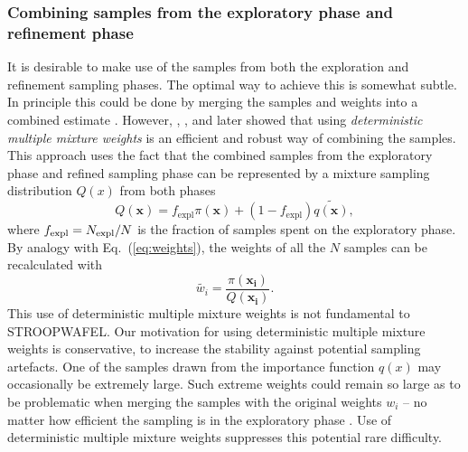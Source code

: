 \documentclass[a4paper,fleqn,usenatbib,useAMS,usedcolumn]{mnras}
\newcommand{\AISs}{\textsc{STROOPWAFEL}}
\begin{document}
\subsubsection{Combining samples from the exploratory phase and refinement phase}
\label{subsec:CombiningSamples}
%
It is desirable to make use of the samples from both the exploration and refinement sampling phases.  The optimal way to achieve this is somewhat subtle. 
In principle this could be done by merging the samples and weights into a combined estimate \citep[see Chapter 14][]{robert2013monte}. However, \citet{Veach:1995:OCS:218380.218498},  \citet{doi:10.1080/00401706.1995.10484303}, and later \citet{doi:10.1080/01621459.2000.10473909} showed that using 
\emph{deterministic multiple mixture weights} is an efficient and robust way of combining the samples. This approach uses the fact that the combined samples from the exploratory phase and refined sampling phase can be represented by a mixture sampling distribution $Q(x)$ from both phases
%
\begin{equation}
	Q(\boldsymbol{x}) =  f_{\text{expl}}  \pi(\boldsymbol{x})  +  (1 - f_{\text{expl}}) \widetilde{q(\boldsymbol{x})}, 
\label{eq:CombinedDistribution}
\end{equation}
%
where $f_{\rm{expl}} = N_{\rm{expl}} / N $ is the fraction of samples spent on the exploratory phase.  %
By analogy with Eq.~(\ref{eq:weights}), the weights of all the $N$ samples can be recalculated with 
\begin{equation}
	\widetilde{w_i} = \frac{\pi(\boldsymbol{x_i})}{Q(\boldsymbol{x_i})}.
	\label{eq:weightsMixture}
\end{equation} 
%
This use of deterministic multiple mixture weights is not fundamental to \AISs{}.  Our motivation for using deterministic multiple mixture weights is conservative, to increase the stability against potential sampling artefacts.  One of the samples drawn from the importance function $q(x)$ may occasionally be extremely large. Such extreme weights could remain so large as to be problematic when merging the samples with the original weights $w_i$ -- no matter how efficient the sampling is in the exploratory phase  \citep{cornuet2012adaptive}.  Use of deterministic multiple mixture weights suppresses this potential rare difficulty.
\end{document}
